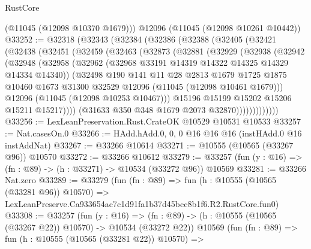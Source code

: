 \begin{lexlean}{RustCore}
\begin{coremodule}
      (@11045 (@12098 @10370 @1679)))
    @12096
    (@11045 (@12098 @10261 @10442))
@33252 := @32318
    (@32343
      (@32384
        (@32386
          (@32388
            (@32405
              (@32421
                (@32438
                  (@32451
                    (@32459
                      (@32463
                        (@32873
                          (@32881
                            (@32929
                              (@32938
                                (@32942
                                  (@32948
                                    (@32958
                                      (@32962
                                        (@32968 @33191 @14319 @14322 @14325 @14329 @14334 @14340))
                                      (@32498
                                        @190
                                        @141
                                        @11
                                        @28
                                        @2813
                                        @1679
                                        @1725
                                        @1875
                                        @10460
                                        @1673
                                        @31300
                                        @32529
                                        @12096
                                        (@11045 (@12098 @10461 @1679)))
                                      @12096
                                      (@11045 (@12098 @10253 @10467)))
                                    @15196
                                    @15199
                                    @15202
                                    @15206
                                    @15211
                                    @15217))))
                            (@31633 @350 @348 @1679 @2073 @32870)))))))))))))
@33256 := LexLeanPreservation.Rust.CrateOK @10529 @10531 @10533
@33257 := Nat.casesOn.{0}
@33266 := HAdd.hAdd.{0, 0, 0} @16 @16 @16 (instHAdd.{0} @16 instAddNat)
@33267 := @33266 @10614
@33271 := @10555 (@10565 (@33267 @96)) @10570
@33272 := @33266 @10612
@33279 := @33257 (fun (y : @16) => (fn : @89) -> (h : @33271) -> @10534 (@33272 @96)) @10569
@33281 := @33266 Nat.zero
@33289 := @33279
    (fun (fn : @89) =>
    fun (h : @10555 (@10565 (@33281 @96)) @10570) =>
    LexLeanPreserve.Ca933654ac7c1d91fa1b37d45bcc8b1f6.R2.RustCore.fun0)
@33308 := @33257
    (fun (y : @16) =>
    (fn : @89) -> (h : @10555 (@10565 (@33267 @22)) @10570) -> @10534 (@33272 @22))
    @10569
    (fun (fn : @89) =>
    fun (h : @10555 (@10565 (@33281 @22)) @10570) =>

\end{coremodule}
\end{lexlean}
